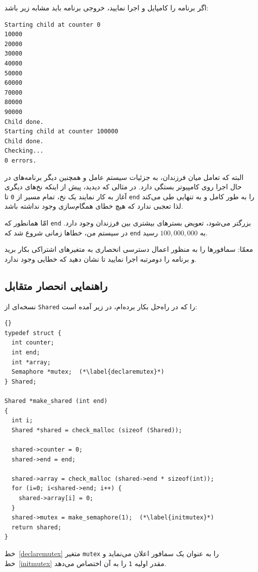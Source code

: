 \documentclass{book}
\newcommand{\clearemptydoublepage}{\newpage\cleardoublepage}
\begin{document}
    اگر برنامه را کامپایل و اجرا نمایید، خروجی برنامه باید مشابه زیر باشد: 

\begingroup
\setLTR
\begin{verbatim}
Starting child at counter 0
10000
20000
30000
40000
50000
60000
70000
80000
90000
Child done.
Starting child at counter 100000
Child done.
Checking...
0 errors.
\end{verbatim}
\endgroup

    البته که تعامل میان فرزندان، به جزئیات سیستم عامل و همچنین دیگر برنامه‌های در حال اجرا روی کامپیوتر بستگی دارد. 
    در مثالی که دیدید، پیش از اینکه نخ‌های دیگری آغاز به کار نمایند یک نخ، تمام مسیر از {\tt 0} تا  {\tt end} را به طور کامل و به تنهایی طی می‌کند
    لذا تعجبی ندارد که هیچ خطای همگام‌سازی وجود نداشته باشد. 

    امّا همانطور که {\tt end}  بزرگتر می‌شود، تعویض بسترهای بیشتری بین فرزندان وجود دارد. 
    در سیستم من، خطاها زمانی شروع شد که {\tt end} به  $100,000,000$ رسید. 

    معمّا:‌ سمافورها را به منظور اعمال دسترسی انحصاری به متغیرهای اشتراکی بکار برید و برنامه را دومرتبه اجرا نمایید تا نشان دهید که خطایی وجود ندارد. 
    
\clearemptydoublepage
\subsection{راهنمایی انحصار متقابل}

    نسخه‌ای از {\tt Shared} را که در راه‌حل بکار برده‌ام، در زیر آمده است:

\begin{latin}
\begin{lstlisting}[title={}]{}
typedef struct {
  int counter;
  int end;
  int *array;
  Semaphore *mutex;  (*\label{declaremutex}*)
} Shared;

Shared *make_shared (int end)
{
  int i;
  Shared *shared = check_malloc (sizeof (Shared));

  shared->counter = 0;
  shared->end = end;

  shared->array = check_malloc (shared->end * sizeof(int));
  for (i=0; i<shared->end; i++) {
    shared->array[i] = 0;
  }
  shared->mutex = make_semaphore(1);  (*\label{initmutex}*)
  return shared;
}
\end{lstlisting}
\end{latin}

    خط~\ref{declaremutex} متغیر  {\tt mutex} را به عنوان یک سمافور اعلان می‌نماید و 
    خط~\ref{initmutex} مقدر اولیه  {\tt 1} را به آن اختصاص می‌دهد. 
\end{document}

